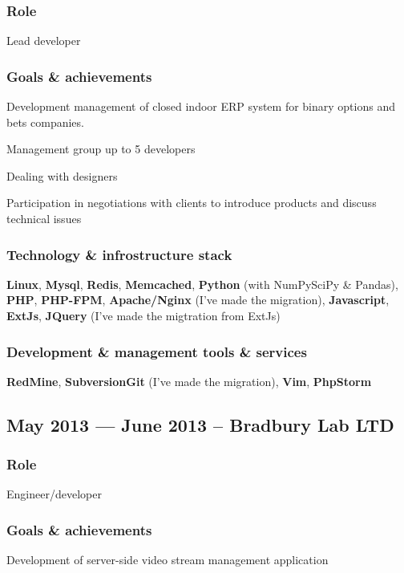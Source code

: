 \documentclass[10pt, a4paper, english]{article}
\begin{document}
    \subsubsection* {Role}
      Lead developer
    \subsubsection* {Goals \& achievements}
      \begin {list}{\textbullet}{}
        \item Development management of closed indoor ERP system for binary options and bets companies.
        \item Management group up to 5 developers
        \item Dealing with designers
        \item Participation in negotiations with clients to introduce products and discuss technical issues
      \end{list}
    \subsubsection* {Technology \& infrostructure stack}
      \textbf{Linux}, \textbf{Mysql}, \textbf{Redis}, \textbf{Memcached}, \textbf{Python} (with NumPy\/SciPy
      \& Pandas), \textbf{PHP}, \textbf{PHP-FPM}, \textbf{Apache/Nginx} (I've made the migration),
      \textbf{Javascript}, \textbf{ExtJs}, \textbf{JQuery} (I've made the migtration from ExtJs)
    \subsubsection* {Development \& management tools \& services}
      \textbf{RedMine}, \textbf{Subversion\/Git} (I've made the migration), \textbf{Vim},
      \textbf{PhpStorm}


  \subsection* {May 2013 — June 2013 -- \textbf{Bradbury Lab LTD}}
    \subsubsection* {Role}
      Engineer/developer
    \subsubsection* {Goals \& achievements}
      Development of server-side video stream management application
\end{document}

